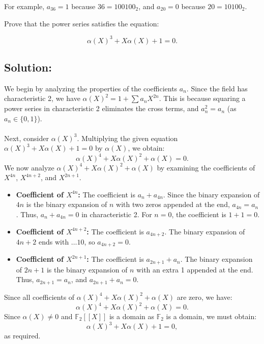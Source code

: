 \documentclass[11pt, a4paper, oneside]{article}
\newcommand{\solution}[1][]{\subsection*{#1}\hfill \par}
\theoremstyle{remark}
\theoremstyle{lemma}
\begin{document}
For example, \( a_{36} = 1 \) because \( 36 = 100100_2 \), and \( a_{20} = 0 \) because \( 20 = 10100_2 \). 

Prove that the power series satisfies the equation:

\[
\alpha(X)^3 + X \alpha(X) + 1 = 0.
\]

\solution[Solution:]
We begin by analyzing the properties of the coefficients \( a_n \). Since the field has characteristic 2, we have \( \alpha(X)^2 = 1 + \sum a_n X^{2n} \). This is because squaring a power series in characteristic 2 eliminates the cross terms, and \( a_n^2 = a_n \) (as \( a_n \in \{0, 1\} \)).
\\\\
Next, consider \( \alpha(X)^3 \). Multiplying the given equation \( \alpha(X)^3 + X \alpha(X) + 1 = 0 \) by \( \alpha(X) \), we obtain:
\[
\alpha(X)^4 + X \alpha(X)^2 + \alpha(X) = 0.
\]
We now analyze \( \alpha(X)^4 + X \alpha(X)^2 + \alpha(X) \) by examining the coefficients of \( X^{4n} \), \( X^{4n+2} \), and \( X^{2n+1} \).
\begin{itemize}
    \item \textbf{Coefficient of \( X^{4n} \):} The coefficient is \( a_n + a_{4n} \). Since the binary expansion of \( 4n \) is the binary expansion of \( n \) with two zeros appended at the end, \( a_{4n} = a_n \). Thus, \( a_n + a_{4n} = 0 \) in characteristic 2. For \( n = 0 \), the coefficient is \( 1 + 1 = 0 \).
    
    \item \textbf{Coefficient of \( X^{4n+2} \):} The coefficient is \( a_{4n+2} \). The binary expansion of \( 4n+2 \) ends with \( \dots 10 \), so \( a_{4n+2} = 0 \).

    \item \textbf{Coefficient of \( X^{2n+1} \):} The coefficient is \( a_{2n+1} + a_n \). The binary expansion of \( 2n+1 \) is the binary expansion of \( n \) with an extra 1 appended at the end. Thus, \( a_{2n+1} = a_n \), and \( a_{2n+1} + a_n = 0 \).
\end{itemize}
Since all coefficients of \( \alpha(X)^4 + X \alpha(X)^2 + \alpha(X) \) are zero, we have:
\[
\alpha(X)^4 + X \alpha(X)^2 + \alpha(X) = 0.
\]
Since \( \alpha(X) \neq 0 \) and $\mathbb{F}_{2}[[X]]$ is a domain as $\mathbb{F}_{2}$ is a domain, we must obtain:
\[
\alpha(X)^3 + X \alpha(X) + 1 = 0,
\]
as required.
\end{document}
